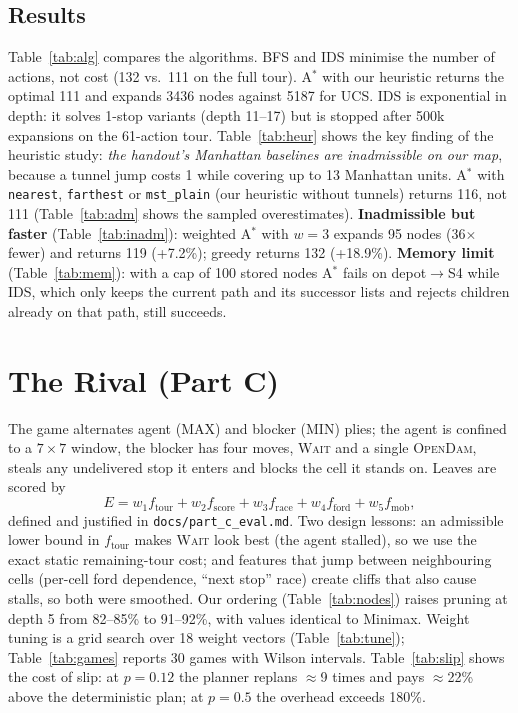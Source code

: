 \documentclass[conference]{IEEEtran}
\begin{document}
\subsection{Results}
Table~\ref{tab:alg} compares the algorithms. BFS and IDS minimise the number of actions, not
cost (132 vs.\ 111 on the full tour). A$^*$ with our heuristic returns the optimal 111 and
expands 3436 nodes against 5187 for UCS. IDS is exponential in depth: it solves 1-stop
variants (depth 11--17) but is stopped after 500k expansions on the 61-action tour.
Table~\ref{tab:heur} shows the key finding of the heuristic study: \emph{the handout's
Manhattan baselines are inadmissible on our map}, because a tunnel jump costs 1 while covering
up to 13 Manhattan units. A$^*$ with \texttt{nearest}, \texttt{farthest} or \texttt{mst\_plain}
(our heuristic without tunnels) returns 116, not 111 (Table~\ref{tab:adm} shows the sampled
overestimates). \textbf{Inadmissible but faster} (Table~\ref{tab:inadm}): weighted A$^*$ with
$w=3$ expands 95 nodes (36$\times$ fewer) and returns 119 (+7.2\%); greedy returns 132 (+18.9\%).
\textbf{Memory limit} (Table~\ref{tab:mem}): with a cap of 100 stored nodes A$^*$ fails on
depot$\to$S4 while IDS, which only keeps the current path and its successor lists and rejects
children already on that path, still succeeds.

\section{The Rival (Part C)}
The game alternates agent (MAX) and blocker (MIN) plies; the agent is confined to a $7\times7$
window, the blocker has four moves, \textsc{Wait} and a single \textsc{OpenDam}, steals any
undelivered stop it enters and blocks the cell it stands on. Leaves are scored by
\begin{equation}
E = w_1 f_{\text{tour}} + w_2 f_{\text{score}} + w_3 f_{\text{race}} + w_4 f_{\text{ford}} + w_5 f_{\text{mob}},
\end{equation}
defined and justified in \texttt{docs/part\_c\_eval.md}. Two design lessons: an admissible lower
bound in $f_{\text{tour}}$ makes \textsc{Wait} look best (the agent stalled), so we use the exact
static remaining-tour cost; and features that jump between neighbouring cells (per-cell ford
dependence, ``next stop'' race) create cliffs that also cause stalls, so both were smoothed.
Our ordering (Table~\ref{tab:nodes}) raises pruning at depth 5 from 82--85\% to 91--92\%, with
values identical to Minimax. Weight tuning is a grid search over 18 weight vectors
(Table~\ref{tab:tune}); Table~\ref{tab:games} reports 30 games with Wilson intervals.
Table~\ref{tab:slip} shows the cost of slip: at $p=0.12$ the planner replans $\approx$9 times
and pays $\approx$22\% above the deterministic plan; at $p=0.5$ the overhead exceeds 180\%.
\end{document}
